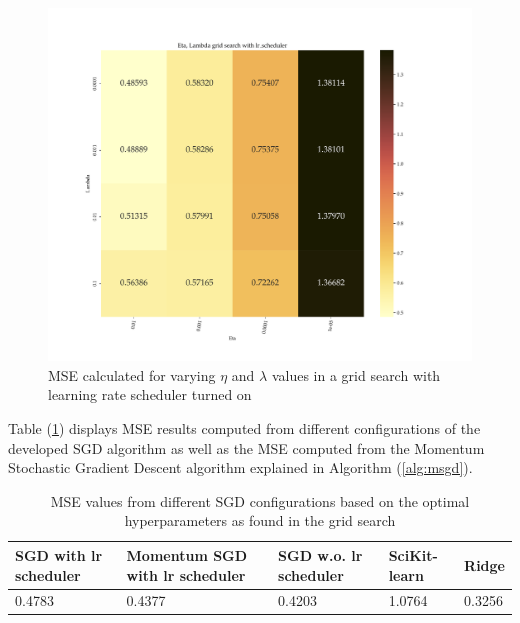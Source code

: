 \documentclass
[twocolumn,
secnumarabic,
nobibnotes,
aps,
prl,
reprint,
groupedaddress,
amsmath,
amssymb
]{revtex4-2}
\begin{document}
\begin{figure}
  \includegraphics[width=\textwidth]{figures/EX_A__gridsearch_withlr.pdf}
  \caption{\label{fig:a_gslr}MSE calculated for varying $\eta$ and $\lambda$ values in a grid search with learning rate scheduler turned on}
\end{figure}

Table (\ref{tab:a_mse}) displays MSE results computed from different configurations of the developed SGD algorithm as well as the MSE computed from the Momentum Stochastic Gradient Descent algorithm explained in Algorithm (\ref{alg:msgd}).

\begin{table}
  \caption{\label{tab:a_mse}MSE values from different SGD configurations based on the optimal hyperparameters as found in the grid search}
  \begin{ruledtabular}
    \begin{tabular}{lllll}
      SGD with lr scheduler & Momentum SGD with lr scheduler & SGD w.o. lr scheduler & SciKit-learn & Ridge  \\
      \hline
      0.4783                & 0.4377                         & 0.4203                & 1.0764       & 0.3256 \\
    \end{tabular}
  \end{ruledtabular}
\end{table}
\end{document}
